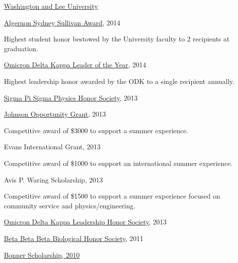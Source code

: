 \documentclass[10pt]{article}
\begin{document}
\href{https://www.wlu.edu/}{Washington and Lee University}
\begin{innerlist}
\item \href{https://www.wlu.edu/university-registrar/policies-and-procedures/university-honors-board/sullivan-award}{Algernon Sydney Sullivan Award}, 2014
\begin{innerlist}
\item Highest student honor bestowed by the University faculty to 2 recipients at graduation.
\end{innerlist}
\item \href{http://odk.org/circle/wlu/}{Omicron Delta Kappa Leader of the Year}, 2014
\begin{innerlist}
\item Highest leadership honor awarded by the ODK to a single recipient annually.
\end{innerlist}
\item \href{https://www.wlu.edu/physics-and-engineering-department/opportunities-for-students/physics-honor-society}{Sigma Pi Sigma Physics Honor Society}, 2013
\item \href{https://www.wlu.edu/johnson-program/johnson-opportunity-grants/past-recipients/2013-johnson-opportunity-grant-winners/alvin-thomas-14}{Johnson Opportunity Grant}, 2013
\begin{innerlist}
\item Competitive award of \$3000 to support a summer experience.
\end{innerlist}
\item Evans International Grant, 2013
\begin{innerlist}
\item Competitive award of \$1000 to support an international summer experience.
\end{innerlist}
\item Avis P. Waring Scholarship, 2013
\begin{innerlist}
\item Competitive award of \$1500 to support a summer experience focused on community service and physics/engineering.
\end{innerlist}
\item \href{https://www.wlu.edu/university-registrar/policies-and-procedures/university-honors-board/omicron-delta-kappa}{Omicron Delta Kappa Leadership Honor Society}, 2013
\item \href{http://www2.wlu.edu/x36446.xml}{Beta Beta Beta Biological Honor Society}, 2011
\item \href{https://www.wlu.edu/shepherd-program/community-based-learning-opportunities/bonner-program}{Bonner Scholarship, 2010}

\end{innerlist}
\end{document}
